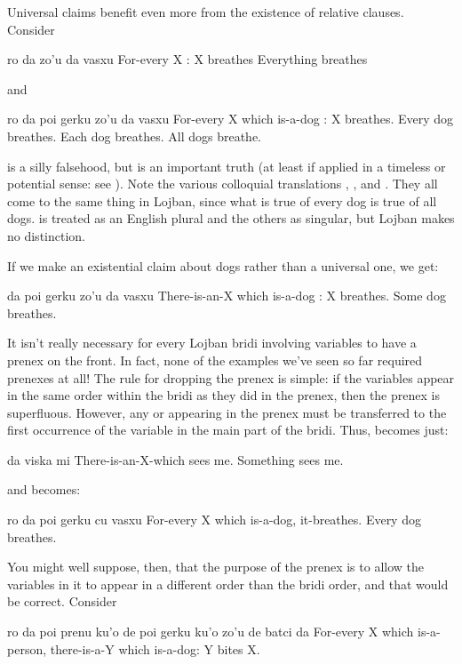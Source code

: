 Universal claims benefit even more from the existence of
    relative clauses. Consider
\begin{example}
ro da zo'u da vasxu\n
For-every X : X breathes\n
Everything breathes
\end{example}

{\noindent}and
\begin{example}
ro da poi gerku zo'u da vasxu\n
For-every X which is-a-dog : X breathes.\n
Every dog breathes.\n
Each dog breathes.\n
All dogs breathe.
\end{example}

 is a silly falsehood, but  is an important truth (at least if
    applied in a timeless or potential sense: see ). Note the various colloquial
    translations , , and .
    They all come to the same thing in Lojban, since what is true
    of every dog is true of all dogs.  is treated as an
    English plural and the others as singular, but Lojban makes no
    distinction. 

If we make an existential claim about dogs rather than a
    universal one, we get:
\begin{example}
da poi gerku zo'u da vasxu\n
There-is-an-X which is-a-dog : X breathes.\n
Some dog breathes.
\end{example}



It isn't really necessary for every Lojban bridi involving
    variables to have a prenex on the front. In fact, none of the
    examples we've seen so far required prenexes at all! The rule
    for dropping the prenex is simple: if the variables appear in
    the same order within the bridi as they did in the prenex, then
    the prenex is superfluous. However, any  or 
    appearing in the prenex must be transferred to the first
    occurrence of the variable in the main part of the bridi. Thus,
     becomes just:
\begin{example}
da viska mi\n
There-is-an-X-which sees me.\n
Something sees me.
\end{example}

{\noindent}and  becomes:
\begin{example}
ro da poi gerku cu vasxu\n
For-every X which is-a-dog, it-breathes.\n
Every dog breathes.
\end{example}

You might well suppose, then, that the purpose of the prenex is
    to allow the variables in it to appear in a different order
    than the bridi order, and that would be correct. Consider
\begin{example}
ro da poi prenu ku'o\n
\T	de poi gerku ku'o zo'u\n
\T	de batci da\n
For-every X which is-a-person,\n
\T	there-is-a-Y which is-a-dog:\n
\T	Y bites X.
\end{example}

